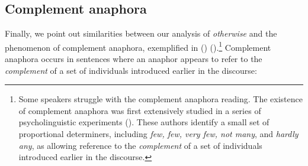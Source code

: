 %
%
%
%
%
%
%
%
%

\subsection{Complement anaphora}


Finally, we point out similarities between our analysis of \textit{otherwise} and the phenomenon of complement anaphora, exemplified in (\nextx) (\citealt{evans1977, evans1980, nouwen2003}).\footnote{Some speakers struggle with the complement anaphora reading. The existence of complement anaphora was first extensively studied in a series of psycholinguistic experiments (\citealt{Moxey1986, sanford1994}). These authors  identify a small set of proportional determiners, including \textit{few, few, very few, not many}, and \textit{hardly any}, as allowing reference to the \textit{complement} of a set of individuals introduced earlier in the discourse.} Complement anaphora occurs in sentences where an anaphor appears to refer to the \textit{complement} of a set of individuals introduced earlier in the discourse: 

